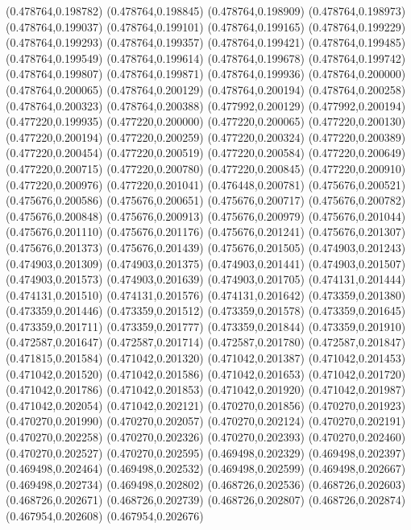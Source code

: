 (0.478764,0.198782)
(0.478764,0.198845)
(0.478764,0.198909)
(0.478764,0.198973)
(0.478764,0.199037)
(0.478764,0.199101)
(0.478764,0.199165)
(0.478764,0.199229)
(0.478764,0.199293)
(0.478764,0.199357)
(0.478764,0.199421)
(0.478764,0.199485)
(0.478764,0.199549)
(0.478764,0.199614)
(0.478764,0.199678)
(0.478764,0.199742)
(0.478764,0.199807)
(0.478764,0.199871)
(0.478764,0.199936)
(0.478764,0.200000)
(0.478764,0.200065)
(0.478764,0.200129)
(0.478764,0.200194)
(0.478764,0.200258)
(0.478764,0.200323)
(0.478764,0.200388)
(0.477992,0.200129)
(0.477992,0.200194)
(0.477220,0.199935)
(0.477220,0.200000)
(0.477220,0.200065)
(0.477220,0.200130)
(0.477220,0.200194)
(0.477220,0.200259)
(0.477220,0.200324)
(0.477220,0.200389)
(0.477220,0.200454)
(0.477220,0.200519)
(0.477220,0.200584)
(0.477220,0.200649)
(0.477220,0.200715)
(0.477220,0.200780)
(0.477220,0.200845)
(0.477220,0.200910)
(0.477220,0.200976)
(0.477220,0.201041)
(0.476448,0.200781)
(0.475676,0.200521)
(0.475676,0.200586)
(0.475676,0.200651)
(0.475676,0.200717)
(0.475676,0.200782)
(0.475676,0.200848)
(0.475676,0.200913)
(0.475676,0.200979)
(0.475676,0.201044)
(0.475676,0.201110)
(0.475676,0.201176)
(0.475676,0.201241)
(0.475676,0.201307)
(0.475676,0.201373)
(0.475676,0.201439)
(0.475676,0.201505)
(0.474903,0.201243)
(0.474903,0.201309)
(0.474903,0.201375)
(0.474903,0.201441)
(0.474903,0.201507)
(0.474903,0.201573)
(0.474903,0.201639)
(0.474903,0.201705)
(0.474131,0.201444)
(0.474131,0.201510)
(0.474131,0.201576)
(0.474131,0.201642)
(0.473359,0.201380)
(0.473359,0.201446)
(0.473359,0.201512)
(0.473359,0.201578)
(0.473359,0.201645)
(0.473359,0.201711)
(0.473359,0.201777)
(0.473359,0.201844)
(0.473359,0.201910)
(0.472587,0.201647)
(0.472587,0.201714)
(0.472587,0.201780)
(0.472587,0.201847)
(0.471815,0.201584)
(0.471042,0.201320)
(0.471042,0.201387)
(0.471042,0.201453)
(0.471042,0.201520)
(0.471042,0.201586)
(0.471042,0.201653)
(0.471042,0.201720)
(0.471042,0.201786)
(0.471042,0.201853)
(0.471042,0.201920)
(0.471042,0.201987)
(0.471042,0.202054)
(0.471042,0.202121)
(0.470270,0.201856)
(0.470270,0.201923)
(0.470270,0.201990)
(0.470270,0.202057)
(0.470270,0.202124)
(0.470270,0.202191)
(0.470270,0.202258)
(0.470270,0.202326)
(0.470270,0.202393)
(0.470270,0.202460)
(0.470270,0.202527)
(0.470270,0.202595)
(0.469498,0.202329)
(0.469498,0.202397)
(0.469498,0.202464)
(0.469498,0.202532)
(0.469498,0.202599)
(0.469498,0.202667)
(0.469498,0.202734)
(0.469498,0.202802)
(0.468726,0.202536)
(0.468726,0.202603)
(0.468726,0.202671)
(0.468726,0.202739)
(0.468726,0.202807)
(0.468726,0.202874)
(0.467954,0.202608)
(0.467954,0.202676)
